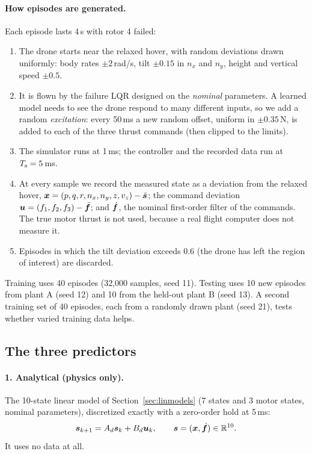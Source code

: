 \paragraph{How episodes are generated.} Each episode lasts 4\,s with rotor 4 failed:
\begin{enumerate}
  \item The drone starts near the relaxed hover, with random deviations drawn uniformly: body rates $\pm2$\,rad/s, tilt $\pm0.15$ in $n_x$ and $n_y$, height and vertical speed $\pm0.5$.
  \item It is flown by the failure LQR designed on the \emph{nominal} parameters. A learned model needs to see the drone respond to many different inputs, so we add a random \emph{excitation}: every 50\,ms a new random offset, uniform in $\pm0.35$\,N, is added to each of the three thrust commands (then clipped to the limits).
  \item The simulator runs at 1\,ms; the controller and the recorded data run at $T_{\mathrm{s}} = 5$\,ms.
  \item At every sample we record the measured state as a deviation from the relaxed hover, $\boldsymbol{x} = (p,q,r,n_x,n_y,z,v_z) - \bar{\boldsymbol{s}}$; the command deviation $\boldsymbol{u} = (f_1,f_2,f_3) - \bar{\boldsymbol{f}}$; and $\hat{\boldsymbol{f}}$, the nominal first-order filter of the commands. The true motor thrust is not used, because a real flight computer does not measure it.
  \item Episodes in which the tilt deviation exceeds 0.6 (the drone has left the region of interest) are discarded.
\end{enumerate}
Training uses 40 episodes (32,000 samples, seed 11). Testing uses 10 new episodes from plant A (seed 12) and 10 from the held-out plant B (seed 13). A second training set of 40 episodes, each from a randomly drawn plant (seed 21), tests whether varied training data helps.

\subsection{The three predictors}
\paragraph{1. Analytical (physics only).} The 10-state linear model of Section~\ref{sec:linmodels} (7 states and 3 motor states, nominal parameters), discretized exactly with a zero-order hold at 5\,ms:
\begin{equation}
  \boldsymbol{s}_{k+1} = A_d\boldsymbol{s}_k + B_d\boldsymbol{u}_k, \qquad \boldsymbol{s} = (\boldsymbol{x}, \hat{\boldsymbol{f}}) \in\mathbb R^{10}.
\end{equation}
It uses no data at all.

